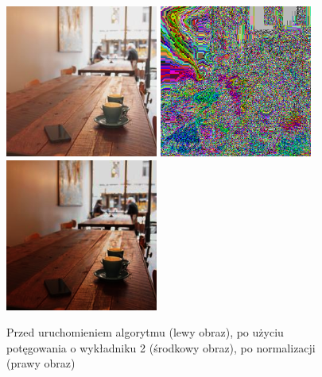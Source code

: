 \documentclass[a4paper,12pt]{book}
\begin{document}
\begin{figure}[H]
	\caption{Przed uruchomieniem algorytmu (lewy obraz), po użyciu potęgowania o wykładniku 2 (środkowy obraz), po normalizacji (prawy obraz)}
	\includegraphics[width=5cm, height=5cm]{coffee-unmodified.jpg}
	\includegraphics[width=5cm, height=5cm]{3-4/power-color-coffee-2.png}
	\includegraphics[width=5cm, height=5cm]{3-4/power-color-coffee-2-norm.png}
\end{figure}
\end{document}
